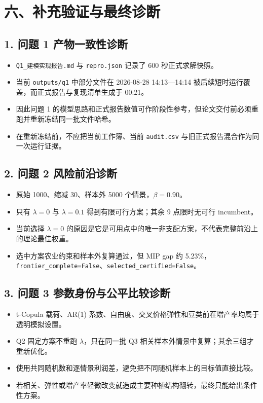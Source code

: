 \documentclass[UTF8,11pt,a4paper]{ctexart}
\begin{document}
\section{六、补充验证与最终诊断}

\subsection{1. 问题 1 产物一致性诊断}

\begin{itemize}
\item \texttt{Q1\_建模实现报告.md} 与 \texttt{repro.json} 记录了 600 秒正式求解快照。
\item 当前 \texttt{outputs/q1} 中部分文件在 2026-08-28 14:13—14:14 被后续短时运行覆盖，而正式报告与复现清单生成于 00:21。
\item 因此问题 1 的模型思路和正式报告数值可作阶段性参考，但论文交付前必须重跑并重新冻结同一批文件哈希。
\item 在重新冻结前，不应把当前工作簿、当前 \texttt{audit.csv} 与旧正式报告混合作为同一次运行证据。
\end{itemize}

\subsection{2. 问题 2 风险前沿诊断}

\begin{itemize}
\item 原始 1000、缩减 30、样本外 5000 个情景，\(\beta{}=0.90\)。
\item 只有 \(\lambda{}=0\) 与 \(\lambda{}=0.1\) 得到有限可行方案；其余 9 点限时无可行 incumbent。
\item 当前选择 \(\lambda{}=0\) 的原因是它是可用点中的唯一非支配方案，不代表完整前沿上的理论最佳权重。
\item 选中方案农业约束和样本外复算通过，但 MIP gap 约 5.23\%，\texttt{frontier\_complete=False}、\texttt{selected\_certified=False}。
\end{itemize}

\subsection{3. 问题 3 参数身份与公平比较诊断}

\begin{itemize}
\item t-Copula 载荷、AR(1) 系数、自由度、交叉价格弹性和豆类前茬增产率均属于透明模拟设置。
\item Q2 固定方案不重跑 \(\lambda{}\)，只在同一批 Q3 相关样本外情景中复算；其余三组才重新优化。
\item 使用共同随机数和逐情景利润差，避免把不同随机样本上的目标值直接比较。
\item 若相关、弹性或增产率轻微改变就造成主要种植结构翻转，最终只能给出条件性方案。
\end{itemize}
\end{document}
